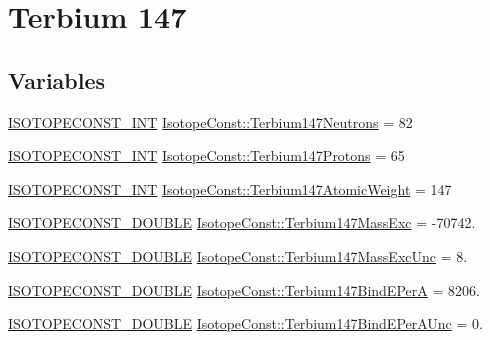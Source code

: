\hypertarget{group___isotope_const-_terbium-_tb147}{}\section{Terbium 147}
\label{group___isotope_const-_terbium-_tb147}
\subsection*{Variables}
\begin{DoxyCompactItemize}
\item 
\mbox{\hyperlink{group___isotope_const-_macros_ga5f18360b3e99483a35c32d789e62621c}{I\+S\+O\+T\+O\+P\+E\+C\+O\+N\+S\+T\+\_\+\+I\+NT}} \mbox{\hyperlink{group___isotope_const-_terbium-_tb147_gac2981ea2e7a94ff6a74f3082fbf33485}{Isotope\+Const\+::\+Terbium147\+Neutrons}} = 82
\item 
\mbox{\hyperlink{group___isotope_const-_macros_ga5f18360b3e99483a35c32d789e62621c}{I\+S\+O\+T\+O\+P\+E\+C\+O\+N\+S\+T\+\_\+\+I\+NT}} \mbox{\hyperlink{group___isotope_const-_terbium-_tb147_ga39ddd7b4bd8d6f66f9b6d948f838a55c}{Isotope\+Const\+::\+Terbium147\+Protons}} = 65
\item 
\mbox{\hyperlink{group___isotope_const-_macros_ga5f18360b3e99483a35c32d789e62621c}{I\+S\+O\+T\+O\+P\+E\+C\+O\+N\+S\+T\+\_\+\+I\+NT}} \mbox{\hyperlink{group___isotope_const-_terbium-_tb147_ga75708c173086e94db6e2056cbc14c6d2}{Isotope\+Const\+::\+Terbium147\+Atomic\+Weight}} = 147
\item 
\mbox{\hyperlink{group___isotope_const-_macros_ga8f45a7272ce02c0b4c65c44636ed719a}{I\+S\+O\+T\+O\+P\+E\+C\+O\+N\+S\+T\+\_\+\+D\+O\+U\+B\+LE}} \mbox{\hyperlink{group___isotope_const-_terbium-_tb147_ga9f8d89b23228b14c71d4197efa6d89f1}{Isotope\+Const\+::\+Terbium147\+Mass\+Exc}} = -\/70742.
\item 
\mbox{\hyperlink{group___isotope_const-_macros_ga8f45a7272ce02c0b4c65c44636ed719a}{I\+S\+O\+T\+O\+P\+E\+C\+O\+N\+S\+T\+\_\+\+D\+O\+U\+B\+LE}} \mbox{\hyperlink{group___isotope_const-_terbium-_tb147_gaed1fa138d45beaec124ede6a3515ee16}{Isotope\+Const\+::\+Terbium147\+Mass\+Exc\+Unc}} = 8.
\item 
\mbox{\hyperlink{group___isotope_const-_macros_ga8f45a7272ce02c0b4c65c44636ed719a}{I\+S\+O\+T\+O\+P\+E\+C\+O\+N\+S\+T\+\_\+\+D\+O\+U\+B\+LE}} \mbox{\hyperlink{group___isotope_const-_terbium-_tb147_gab6a6de67411f3c7e118c42fee71ce5e8}{Isotope\+Const\+::\+Terbium147\+Bind\+E\+PerA}} = 8206.
\item 
\mbox{\hyperlink{group___isotope_const-_macros_ga8f45a7272ce02c0b4c65c44636ed719a}{I\+S\+O\+T\+O\+P\+E\+C\+O\+N\+S\+T\+\_\+\+D\+O\+U\+B\+LE}} \mbox{\hyperlink{group___isotope_const-_terbium-_tb147_gac78c50514c397989cf37bac75b52f918}{Isotope\+Const\+::\+Terbium147\+Bind\+E\+Per\+A\+Unc}} = 0.

\end{DoxyCompactItemize}
